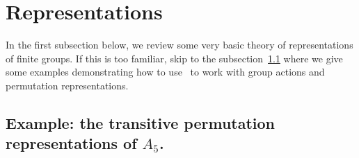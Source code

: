 \section{Representations}
In the first subsection below, we review some very basic theory of representations of
finite groups.  If this is too familiar, skip to the
subsection~\ref{subsection-a5}
where we give some examples demonstrating how to use \gap\ to work with
group actions and permutation representations.

\subsection{Example:  the transitive permutation representations of $A_5$.}
\label{subsection-a5}


\vspace{5mm}
